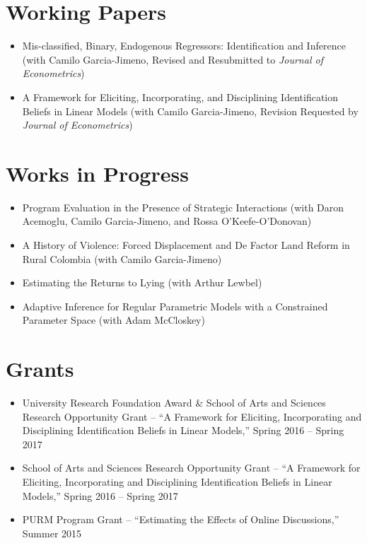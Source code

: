 \documentclass[line,overlapped]{myres}
\begin{document}
\begin{resume}
\section{\sc Working Papers}
\begin{itemize}
  \item Mis-classified, Binary, Endogenous Regressors: Identification and Inference (with Camilo Garcia-Jimeno, Revised and Resubmitted to  \emph{Journal of Econometrics})
  \item A Framework for Eliciting, Incorporating, and Disciplining Identification Beliefs in Linear Models (with Camilo Garcia-Jimeno, Revision Requested by \emph{Journal of Econometrics})
\end{itemize}


\section{\sc Works in Progress}
\begin{itemize}
  \item Program Evaluation in the Presence of Strategic Interactions (with Daron Acemoglu, Camilo Garcia-Jimeno, and Rossa O'Keefe-O'Donovan)
  \item A History of Violence: Forced Displacement and De Factor Land Reform in Rural Colombia (with Camilo Garcia-Jimeno)
  \item Estimating the Returns to Lying (with Arthur Lewbel)
  \item Adaptive Inference for Regular Parametric Models with a Constrained Parameter Space (with Adam McCloskey)
\end{itemize}

\section{\sc Grants}
\begin{itemize}
  \item University Research Foundation Award \& School of Arts and Sciences Research Opportunity Grant  -- ``A Framework for Eliciting, Incorporating and Disciplining Identification Beliefs in Linear Models,'' Spring 2016 -- Spring 2017
  \item School of Arts and Sciences Research Opportunity Grant -- ``A Framework for Eliciting, Incorporating and Disciplining Identification Beliefs in Linear Models,'' Spring 2016 -- Spring 2017   
  \item PURM Program Grant -- ``Estimating the Effects of Online Discussions,'' Summer 2015
\end{itemize}



\end{resume}
\end{document}
